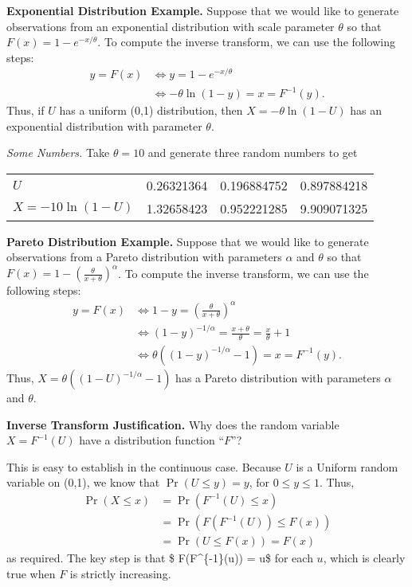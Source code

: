 \documentclass[]{book}
\theoremstyle{definition}
\theoremstyle{definition}
\theoremstyle{definition}
\theoremstyle{remark}
\begin{document}
\textbf{Exponential Distribution Example.} Suppose that we would like to
generate observations from an exponential distribution with scale
parameter \(\theta\) so that \(F(x) = 1 - e^{-x/\theta}\). To compute
the inverse transform, we can use the following steps: \[\begin{aligned}
 y = F(x) &\Leftrightarrow  y = 1-e^{-x/\theta} \\
  &\Leftrightarrow -\theta \ln(1-y) = x = F^{-1}(y) .\end{aligned}\]
Thus, if \(U\) has a uniform (0,1) distribution, then
\(X = -\theta \ln(1-U)\) has an exponential distribution with parameter
\(\theta\).

\emph{Some Numbers.} Take \(\theta = 10\) and generate three random
numbers to get

\begin{longtable}[]{@{}lrrr@{}}
\toprule
\(U\) & 0.26321364 & 0.196884752 & 0.897884218\tabularnewline
\(X = -10\ln(1-U)\) & 1.32658423 & 0.952221285 &
9.909071325\tabularnewline
\bottomrule
\end{longtable}

\textbf{Pareto Distribution Example.} Suppose that we would like to
generate observations from a Pareto distribution with parameters
\(\alpha\) and \(\theta\) so that
\(F(x) = 1 - \left(\frac{\theta}{x+\theta} \right)^{\alpha}\). To
compute the inverse transform, we can use the following steps:
\[\begin{aligned}
 y = F(x) &\Leftrightarrow 1-y = \left(\frac{\theta}{x+\theta} \right)^{\alpha} \\
  &\Leftrightarrow \left(1-y\right)^{-1/\alpha} = \frac{x+\theta}{\theta} = \frac{x}{\theta} +1 \\
    &\Leftrightarrow \theta \left((1-y)^{-1/\alpha} - 1\right) = x = F^{-1}(y) .\end{aligned}\]
Thus, \(X = \theta \left((1-U)^{-1/\alpha} - 1\right)\) has a Pareto
distribution with parameters \(\alpha\) and \(\theta\).

\textbf{Inverse Transform Justification.} Why does the random variable
\(X = F^{-1}(U)\) have a distribution function ``\(F\)''?

This is easy to establish in the continuous case. Because \(U\) is a
Uniform random variable on (0,1), we know that \(\Pr(U \le y) = y\), for
\(0 \le y \le 1\). Thus, \[\begin{aligned}
\Pr(X \le x) &= \Pr(F^{-1}(U) \le x) \\
 &= \Pr(F(F^{-1}(U)) \le F(x)) \\
&= \Pr(U \le F(x)) = F(x)\end{aligned}\] as required. The key step is
that \$ F(F\^{}\{-1\}(u)) = u\$ for each \(u\), which is clearly true
when \(F\) is strictly increasing.
\end{document}
